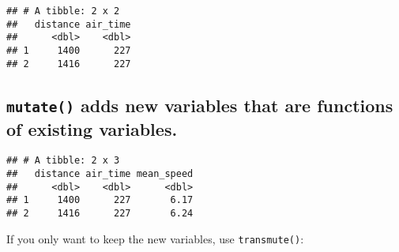\documentclass[]{article}
\newenvironment{Shaded}{\begin{snugshade}}{\end{snugshade}}
\newcommand{\DataTypeTok}[1]{\textcolor[rgb]{0.13,0.29,0.53}{#1}}
\newcommand{\DecValTok}[1]{\textcolor[rgb]{0.00,0.00,0.81}{#1}}
\newcommand{\KeywordTok}[1]{\textcolor[rgb]{0.13,0.29,0.53}{\textbf{#1}}}
\newcommand{\NormalTok}[1]{#1}
\newcommand{\OperatorTok}[1]{\textcolor[rgb]{0.81,0.36,0.00}{\textbf{#1}}}
\newcommand{\StringTok}[1]{\textcolor[rgb]{0.31,0.60,0.02}{#1}}
\begin{document}
\begin{Shaded}
\end{Shaded}

\begin{verbatim}
## # A tibble: 2 x 2
##   distance air_time
##      <dbl>    <dbl>
## 1     1400      227
## 2     1416      227
\end{verbatim}

\hypertarget{mutate-adds-new-variables-that-are-functions-of-existing-variables.}{%
\subsection{\texorpdfstring{\texttt{mutate()} adds new variables that
are functions of existing
variables.}{mutate() adds new variables that are functions of existing variables.}}\label{mutate-adds-new-variables-that-are-functions-of-existing-variables.}}

\begin{Shaded}
\end{Shaded}

\begin{verbatim}
## # A tibble: 2 x 3
##   distance air_time mean_speed
##      <dbl>    <dbl>      <dbl>
## 1     1400      227       6.17
## 2     1416      227       6.24
\end{verbatim}

If you only want to keep the new variables, use \texttt{transmute()}:

\begin{Shaded}
\end{Shaded}
\end{document}
